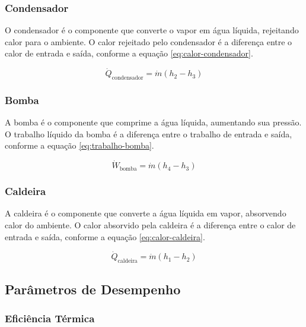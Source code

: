 \documentclass[
	article,			%
	11pt,				%
	oneside,			%
	a4paper,			%
	english,			%
	brazil,				%
	sumario=tradicional
	]{abntex2}
\begin{document}
\subsubsection{Condensador}

O condensador é o componente que converte o vapor em água líquida, rejeitando calor para o ambiente. O calor rejeitado pelo condensador é a diferença entre o calor de entrada e saída, conforme a equação \ref{eq:calor-condensador}.

\begin{equation}
	\dot{Q}_{\text{condensador}} = \dot{m}(h_2 - h_3)
	\label{eq:calor-condensador}
\end{equation}

\subsubsection{Bomba}

A bomba é o componente que comprime a água líquida, aumentando sua pressão. O trabalho líquido da bomba é a diferença entre o trabalho de entrada e saída, conforme a equação \ref{eq:trabalho-bomba}.

\begin{equation}
	\dot{W}_{\text{bomba}} = \dot{m}(h_4 - h_3)
	\label{eq:trabalho-bomba}
\end{equation}

\subsubsection{Caldeira}

A caldeira é o componente que converte a água líquida em vapor, absorvendo calor do ambiente. O calor absorvido pela caldeira é a diferença entre o calor de entrada e saída, conforme a equação \ref{eq:calor-caldeira}.

\begin{equation}
	\dot{Q}_{\text{caldeira}} = \dot{m}(h_1 - h_2)
	\label{eq:calor-caldeira}
\end{equation}

\subsection{Parâmetros de Desempenho}

\subsubsection{Eficiência Térmica}
\end{document}
